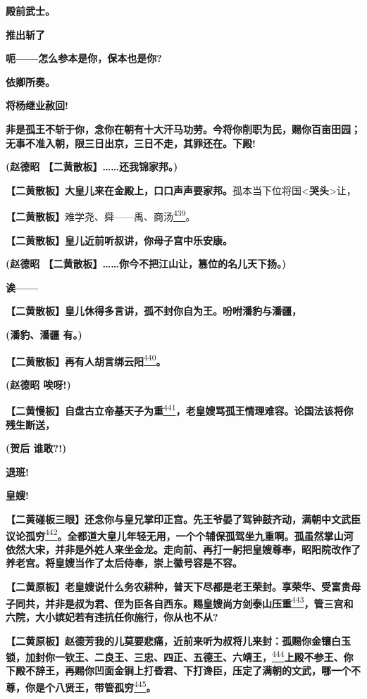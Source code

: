 \textbf{殿前武士。}

\textbf{推出斩了}

\textbf{呃------怎么参本是你，保本也是你?}

\textbf{依卿所奏。}

\textbf{将杨继业赦回!}

\textbf{非是孤王不斩于你，念你在朝有十大汗马功劳。今将你削职为民，赐你百亩田园；无事不准入朝，限三日出京，三日不走，其罪还在。下殿!}

\textbf{(赵德昭 【二黄散板】\ldots{}\ldots{}还我锦家邦。)}

\textbf{【二黄散板】大皇儿来在金殿上，口口声声要家邦。}孤本当下位将国\textless{}\textbf{哭头}\textgreater{}让，

\textbf{【二黄散板】}难学尧、舜------禹、商汤\protect\hyperlink{fn439}{\textsuperscript{439}}。

\textbf{【二黄散板】皇儿近前听叔讲，你母子宫中乐安康。}

\textbf{(赵德昭
【二黄散板】\ldots{}\ldots{}你今不把江山让，篡位的名儿天下扬。)}

\textbf{诶------}

\textbf{【二黄散板】皇儿休得多言讲，孤不封你自为王。吩咐潘豹与潘疆，}

\textbf{(潘豹、潘疆 有。)}

\textbf{【二黄散板】再有人胡言绑云阳}\protect\hyperlink{fn440}{\textsuperscript{440}}\textbf{。}

\textbf{(赵德昭 唉呀!)}

\textbf{【二黄慢板】自盘古立帝基天子为重}\protect\hyperlink{fn441}{\textsuperscript{441}}\textbf{，老皇嫂骂孤王情理难容。论国法该将你残生断送，}

\textbf{(贺后 谁敢?!)}

\textbf{退班!}

\textbf{皇嫂!}

\textbf{【二黄碰板三眼】还念你与皇兄掌印正宫。先王爷晏了驾钟鼓齐动，满朝中文武臣议论孤穷}\protect\hyperlink{fn442}{\textsuperscript{442}}\textbf{。全都道大皇儿年轻无用，一个个辅保孤驾坐九重啊。孤虽然掌山河依然大宋，并非是外姓人来坐金龙。走向前、再打一躬把皇嫂尊奉，昭阳院改作了养老宫。将皇嫂当作了太后侍奉，崇上徽号容是不容。}

\textbf{【二黄原板】老皇嫂说什么务农耕种，普天下尽都是老王荣封。享荣华、受富贵母子同共，并非是叔为君、侄为臣各自西东。赐皇嫂尚方剑泰山压重}\protect\hyperlink{fn443}{\textsuperscript{443}}\textbf{，管三宫和六院，大小嫔妃若有违抗任你施行，你从也不从?}

\textbf{【二黄原板】赵德芳我的儿莫要悲痛，近前来听为叔将儿来封：孤赐你金镶白玉锁，加封你一钦王、二良王、三忠、四正、五德王、六靖王，}\protect\hyperlink{fn444}{\textsuperscript{444}}\textbf{上殿不参王、你下殿不辞王，再赐你凹面金锏上打昏君、下打谗臣，压定了满朝的文武，哪一个不尊，你是个八贤王，带管孤穷}\protect\hyperlink{fn445}{\textsuperscript{445}}\textbf{。}

